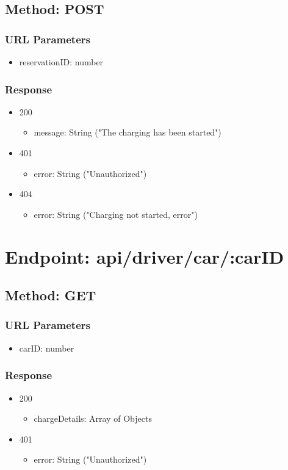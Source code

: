 \subsection*{Method: POST}
\subsubsection*{URL Parameters}
\begin{itemize}
    \item reservationID: number
\end{itemize}
\subsubsection*{Response}
\begin{itemize}
    \item 200
          \begin{itemize}
              \item message: String ("The charging has been started")
          \end{itemize}
    \item 401
          \begin{itemize}
              \item error: String ("Unauthorized")
          \end{itemize}
    \item 404
          \begin{itemize}
              \item error: String ("Charging not started, error")
          \end{itemize}
\end{itemize}

\section*{Endpoint: api/driver/car/:carID}
\subsection*{Method: GET}
\subsubsection*{URL Parameters}
\begin{itemize}
    \item carID: number
\end{itemize}
\subsubsection*{Response}
\begin{itemize}
    \item 200
          \begin{itemize}
              \item chargeDetails: Array of Objects
          \end{itemize}
    \item 401
          \begin{itemize}
              \item error: String ("Unauthorized")
          \end{itemize}
\end{itemize}

